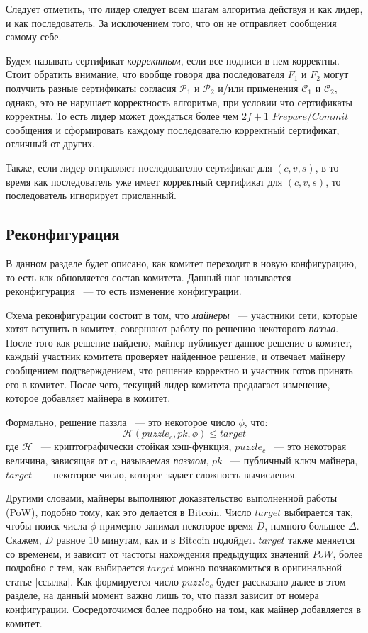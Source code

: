 Следует отметить, что лидер следует всем шагам алгоритма действуя и как лидер, и как последователь. За исключением того, что он не отправляет сообщения самому себе.

Будем называть сертификат \textit{корректным}, если все подписи в нем корректны.
Стоит обратить внимание, что вообще говоря два последователя $F_1$ и $F_2$ могут получить разные сертификаты согласия $\mathcal{P}_1$ и $\mathcal{P}_2$ и/или применения $\mathcal{C}_1$ и $\mathcal{C}_2$, однако, это не нарушает корректность алгоритма, при условии что сертификаты корректны.
То есть лидер может дождаться более чем $2f+1$ $Prepare$/$Commit$ сообщения и сформировать каждому последователю корректный сертификат, отличный от других.

Также, если лидер отправляет последователю сертификат для $(c, v, s)$, в то время как последователь уже имеет корректный сертификат для $(c, v, s)$, то последователь игнорирует присланный.

\subsection{Реконфигурация}
В данном разделе будет описано, как комитет переходит в новую конфигурацию, то есть как обновляется состав комитета. Данный шаг называется реконфигурация ~--- то есть изменение конфигурации.

Cхема реконфигурации состоит в том, что \textit{майнеры} ~--- участники сети, которые хотят вступить в комитет, совершают работу по решению некоторого \textit{паззла}. После того как решение найдено, майнер публикует данное решение в комитет, каждый участник комитета проверяет найденное решение, и отвечает майнеру сообщением подтверждением, что решение корректно и участник готов принять его в комитет.
После чего, текущий лидер комитета предлагает изменение, которое добавляет майнера в комитет.

Формально, решение паззла ~--- это некоторое число $\phi$, что:
$$\mathcal{H}(puzzle_c, pk, \phi) \le target$$
где $\mathcal{H}$ ~--- криптографически стойкая хэш-функция, $puzzle_c$ ~--- это некоторая величина, зависящая от $c$, называемая \textit{паззлом}, $pk$ ~--- публичный ключ майнера, $target$ ~--- некоторое число, которое задает сложность вычисления.

Другими словами, майнеры выполняют доказательство выполненной работы (PoW), подобно тому, как это делается в Bitcoin.  Число $target$ выбирается так, чтобы поиск числа $\phi$ примерно занимал некоторое время $D$, намного большее $\Delta$. Скажем, $D$ равное 10 минутам, как и в Bitcoin подойдет.  $target$ также меняется со временем, и зависит от частоты нахождения предыдущих значений $PoW$, более подробно с тем, как выбирается $target$ можно познакомиться в оригинальной статье [ссылка].
Как формируется число $puzzle_c$ будет рассказано далее в этом разделе, на данный момент важно лишь то, что паззл зависит от номера конфигурации. Сосредоточимся более подробно на том, как майнер добавляется в комитет.

